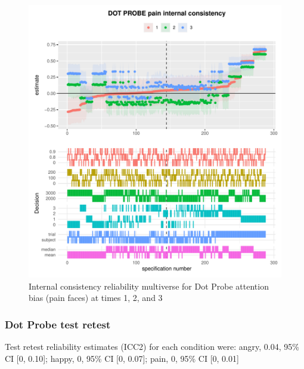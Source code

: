 \documentclass[
  english,
  man,floatsintext]{apa6}
\begin{document}
\begin{figure}
\centering
\includegraphics{Reliability_Multiverse_files/figure-latex/unnamed-chunk-15-1.pdf}
\caption{\label{fig:unnamed-chunk-15}Internal consistency reliability multiverse for Dot Probe attention bias (pain faces) at times 1, 2, and 3}
\end{figure}

\hypertarget{dot-probe-test-retest}{%
\subsubsection{Dot Probe test retest}\label{dot-probe-test-retest}}

Test retest reliability estimates (ICC2) for each condition were: angry, 0.04, 95\% CI {[}0, 0.10{]}; happy, 0, 95\% CI {[}0, 0.07{]}; pain, 0, 95\% CI {[}0, 0.01{]}
\end{document}
